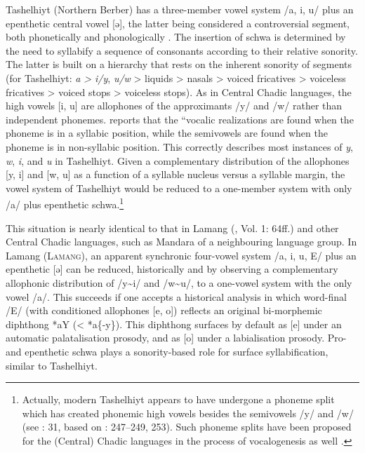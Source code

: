 \documentclass[output=paper]{langscibook}
\begin{document}
Tashelhiyt (Northern Berber) has a three-member vowel system /a, i, u/ plus an epenthetic central vowel [ə], the latter being considered a controversial segment, both phonetically and phonologically \citep{Kossmann2012}. The insertion of schwa is determined by the need to syllabify a sequence of consonants according to their relative sonority. The latter is built on a hierarchy that rests on the inherent sonority of segments (for Tashelhiyt: \textit{a} \textit{> i/y}, \textit{u/w} > liquids > nasals > voiced fricatives > voiceless fricatives > voiced stops > voiceless stops). As in Central Chadic languages, the high vowels [i, u] are allophones of the approximants \mbox{/y/} and /w/ rather than independent phonemes. \citet[30]{Kossmann2012} reports that the “vocalic realizations are found when the phoneme is in a syllabic position, while the semivowels are found when the phoneme is in non-syllabic position. This correctly describes most instances of \textit{y}, \textit{w}, \textit{i}, and \textit{u} in Tashelhiyt. Given a complementary distribution of the allophones [y, i] and [w, u] as a function of a syllable nucleus versus a syllable margin, the vowel system of Tashelhiyt would be reduced to a one-member system with only /a/ plus epenthetic schwa.\footnote{Actually, modern Tashelhiyt appears to have undergone a phoneme split which has created phonemic high vowels besides the semivowels /y/ and /w/ (see \citealt{Kossmann2012}: 31, based on \citealt{Boogert1997}: 247--249, 253). Such phoneme splits have been proposed for the (Central) Chadic languages in the process of vocalogenesis as well \citep{Wolff2017}.} 

This situation is nearly identical to that in Lamang (\citealt{Wolff2015}, Vol. 1: 64ff.) and other Central Chadic languages, such as Mandara of a neighbouring language group. In Lamang (\textsc{Lamang}), an apparent synchronic four-vowel system /a, i, u, E/ plus an epenthetic [ə] can be reduced, historically and by observing a complementary allophonic distribution of /y{\textasciitilde}i/ and /w{\textasciitilde}u/, to a one-vowel system with the only vowel /a/. This succeeds if one accepts a historical analysis in which word-final /E/ (with conditioned allophones [e, o]) reflects an original bi-morphemic diphthong *aY (< *a\{-y\}). This diphthong surfaces by default as [e] under an automatic palatalisation prosody, and as [o] under a labialisation prosody. Pro- and epenthetic schwa plays a sonority-based role for surface syllabification, similar to Tashelhiyt. 
\end{document}
